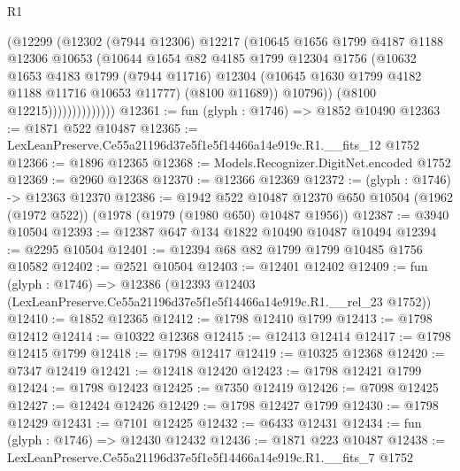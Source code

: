 \begin{lexlean}{R1}
\begin{coremodule}
                          (@12299
                            (@12302
                              (@7944 @12306)
                              @12217
                              (@10645
                                @1656
                                @1799
                                @4187
                                @1188
                                @12306
                                @10653
                                (@10644
                                  @1654
                                  @82
                                  @4185
                                  @1799
                                  @12304
                                  @1756
                                  (@10632
                                    @1653
                                    @4183
                                    @1799
                                    (@7944 @11716)
                                    @12304
                                    (@10645 @1630 @1799 @4182 @1188 @11716 @10653 @11777)
                                    (@8100 @11689))
                                  @10796))
                              (@8100 @12215))))))))))))))
@12361 := fun (glyph : @1746) => @1852 @10490
@12363 := @1871 @522 @10487
@12365 := LexLeanPreserve.Ce55a21196d37e5f1e5f14466a14e919c.R1.__fits_12 @1752
@12366 := @1896 @12365
@12368 := Models.Recognizer.DigitNet.encoded @1752
@12369 := @2960 @12368
@12370 := @12366 @12369
@12372 := (glyph : @1746) -> @12363 @12370
@12386 := @1942
    @522
    @10487
    @12370
    @650
    @10504
    (@1962 (@1972 @522))
    (@1978 (@1979 (@1980 @650) @10487 @1956))
@12387 := @3940 @10504
@12393 := @12387 @647 @134 @1822 @10490 @10487 @10494
@12394 := @2295 @10504
@12401 := @12394 @68 @82 @1799 @1799 @10485 @1756 @10582
@12402 := @2521 @10504
@12403 := @12401 @12402
@12409 := fun (glyph : @1746) =>
  @12386 (@12393 @12403 (LexLeanPreserve.Ce55a21196d37e5f1e5f14466a14e919c.R1.__rel_23 @1752))
@12410 := @1852 @12365
@12412 := @1798 @12410 @1799
@12413 := @1798 @12412
@12414 := @10322 @12368
@12415 := @12413 @12414
@12417 := @1798 @12415 @1799
@12418 := @1798 @12417
@12419 := @10325 @12368
@12420 := @7347 @12419
@12421 := @12418 @12420
@12423 := @1798 @12421 @1799
@12424 := @1798 @12423
@12425 := @7350 @12419
@12426 := @7098 @12425
@12427 := @12424 @12426
@12429 := @1798 @12427 @1799
@12430 := @1798 @12429
@12431 := @7101 @12425
@12432 := @6433 @12431
@12434 := fun (glyph : @1746) => @12430 @12432
@12436 := @1871 @223 @10487
@12438 := LexLeanPreserve.Ce55a21196d37e5f1e5f14466a14e919c.R1.__fits_7 @1752

\end{coremodule}
\end{lexlean}
